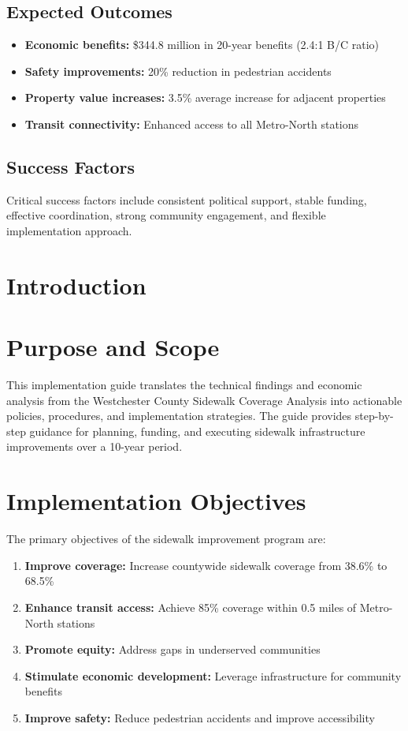 \documentclass[11pt,letterpaper]{article}
\begin{document}
\subsection{Expected Outcomes}

\begin{itemize}
    \item \textbf{Economic benefits:} \$344.8 million in 20-year benefits (2.4:1 B/C ratio)
    \item \textbf{Safety improvements:} 20\% reduction in pedestrian accidents
    \item \textbf{Property value increases:} 3.5\% average increase for adjacent properties
    \item \textbf{Transit connectivity:} Enhanced access to all Metro-North stations
\end{itemize}

\subsection{Success Factors}

Critical success factors include consistent political support, stable funding, effective coordination, strong community engagement, and flexible implementation approach.

\section{Introduction}

\section{Purpose and Scope}

This implementation guide translates the technical findings and economic analysis from the Westchester County Sidewalk Coverage Analysis into actionable policies, procedures, and implementation strategies. The guide provides step-by-step guidance for planning, funding, and executing sidewalk infrastructure improvements over a 10-year period.

\section{Implementation Objectives}

The primary objectives of the sidewalk improvement program are:

\begin{enumerate}
    \item \textbf{Improve coverage:} Increase countywide sidewalk coverage from 38.6\% to 68.5\%
    \item \textbf{Enhance transit access:} Achieve 85\% coverage within 0.5 miles of Metro-North stations
    \item \textbf{Promote equity:} Address gaps in underserved communities
    \item \textbf{Stimulate economic development:} Leverage infrastructure for community benefits
    \item \textbf{Improve safety:} Reduce pedestrian accidents and improve accessibility
\end{enumerate}
\end{document}
